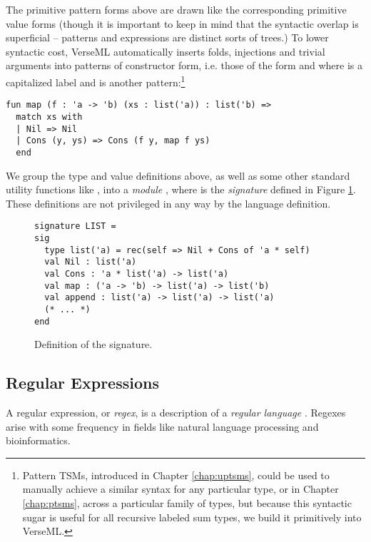 The primitive pattern forms above are drawn like the corresponding primitive value forms (though it is important to keep in mind that the syntactic overlap is superficial -- patterns and expressions are distinct sorts of trees.) To lower syntactic cost, VerseML automatically inserts folds, injections and trivial arguments into patterns of constructor form, i.e. those of the form  and  where  is a capitalized label and  is another pattern:\footnote{Pattern TSMs, introduced in Chapter \ref{chap:uptsms}, could be used to manually achieve a similar syntax for any particular type, or in Chapter \ref{chap:ptsms}, across a particular family of types, but because this syntactic sugar is useful for all recursive labeled sum types, we build it primitively into VerseML.}
\begin{lstlisting}[numbers=none]
fun map (f : 'a -> 'b) (xs : list('a)) : list('b) => 
  match xs with 
  | Nil => Nil 
  | Cons (y, ys) => Cons (f y, map f ys)
  end
\end{lstlisting}

We group the type and value definitions above, as well as some other standard utility functions like , into a \emph{module} , where  is the \emph{signature} defined in Figure \ref{fig:LIST}. These definitions are not privileged in any way by the language definition. %

\begin{figure}[h!]
\begin{lstlisting}[numbers=none]
signature LIST = 
sig 
  type list('a) = rec(self => Nil + Cons of 'a * self)
  val Nil : list('a)
  val Cons : 'a * list('a) -> list('a)
  val map : ('a -> 'b) -> list('a) -> list('b)
  val append : list('a) -> list('a) -> list('a)
  (* ... *)
end
\end{lstlisting}
\caption{Definition of the  signature.}
\label{fig:LIST}
\end{figure}

\subsection{Regular Expressions}\label{sec:syntax-examples-regexps}
A regular expression, or \emph{regex}, is a description of a \emph{regular language} \cite{Thompson:1968:PTR:363347.363387}. Regexes arise with some frequency in fields like natural language processing and bioinformatics.

